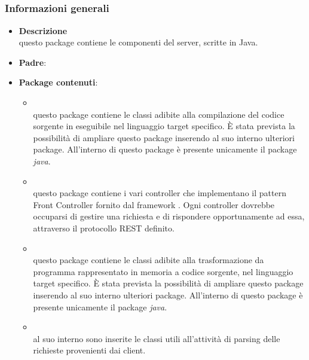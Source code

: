 \subsection{}
\label{\nogloxy{SWEDesigner::Server}}
\subsubsection{Informazioni generali}
\begin{itemize}
\item \textbf{Descrizione}\\
questo package contiene le componenti del server, scritte in Java.
\item \textbf{Padre}: \hyperref[\nogloxy{SWEDesigner}]{}
\item \textbf{Package contenuti}:
\begin{itemize}
\item \hyperref[\nogloxy{SWEDesigner::Server::Compiler}]{}\\
questo package contiene le classi adibite alla compilazione del codice sorgente in eseguibile nel linguaggio target specifico. È stata prevista la possibilità di ampliare questo package inserendo al suo interno ulteriori package. All'interno di questo package è presente unicamente il package \emph{java}.
\item \hyperref[\nogloxy{SWEDesigner::Server::Controller}]{}\\
questo package contiene i vari controller che implementano il pattern Front Controller fornito dal framework \spring{}. Ogni controller dovrebbe occuparsi di gestire una richiesta e di rispondere opportunamente ad essa, attraverso il protocollo REST definito.
\item \hyperref[\nogloxy{SWEDesigner::Server::Generator}]{}\\
questo package contiene le classi adibite alla trasformazione da programma rappresentato in memoria a codice sorgente, nel linguaggio target specifico. È stata prevista la possibilità di ampliare questo package inserendo al suo interno ulteriori package. All'interno di questo package è presente unicamente il package \emph{java}.
\item \hyperref[\nogloxy{SWEDesigner::Server::Parser}]{}\\
al suo interno sono inserite le classi utili all'attività di parsing delle richieste provenienti dai client.

\end{itemize}
\end{itemize}
